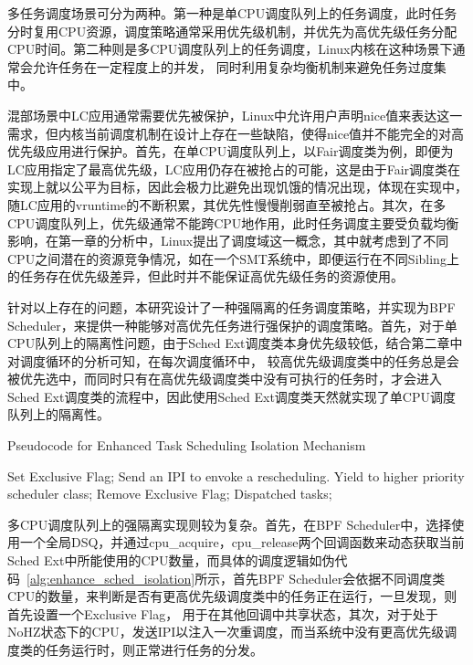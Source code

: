 多任务调度场景可分为两种。第一种是单CPU调度队列上的任务调度，此时任务分时复用CPU资源，调度策略通常采用优先级机制，并优先为高优先级任务分配CPU时间。第二种则是多CPU调度队列上的任务调度，Linux内核在这种场景下通常会允许任务在一定程度上的并发， 同时利用复杂均衡机制来避免任务过度集中。

混部场景中LC应用通常需要优先被保护，Linux中允许用户声明nice值来表达这一需求，但内核当前调度机制在设计上存在一些缺陷，使得nice值并不能完全的对高优先级应用进行保护。首先，在单CPU调度队列上，以Fair调度类为例，即便为LC应用指定了最高优先级，LC应用仍存在被抢占的可能，这是由于Fair调度类在实现上就以公平为目标，因此会极力比避免出现饥饿的情况出现，体现在实现中，随LC应用的vruntime的不断积累，其优先性慢慢削弱直至被抢占。其次，在多CPU调度队列上，优先级通常不能跨CPU地作用，此时任务调度主要受负载均衡影响，在第一章的分析中，Linux提出了调度域这一概念，其中就考虑到了不同CPU之间潜在的资源竞争情况，如在一个SMT系统中，即便运行在不同Sibling上的任务存在优先级差异，但此时并不能保证高优先级任务的资源使用。

针对以上存在的问题，本研究设计了一种强隔离的任务调度策略，并实现为BPF Scheduler，来提供一种能够对高优先任务进行强保护的调度策略。首先，对于单CPU队列上的隔离性问题，由于Sched Ext调度类本身优先级较低，结合第二章中对调度循环的分析可知，在每次调度循环中， 较高优先级调度类中的任务总是会被优先选中，而同时只有在高优先级调度类中没有可执行的任务时，才会进入Sched Ext调度类的流程中，因此使用Sched Ext调度类天然就实现了单CPU调度队列上的隔离性。

\begin{algorithm}
    \caption{Pseudocode for Enhanced Task Scheduling Isolation Mechanism}
    \label{alg:enhance_sched_isolation}
    \begin{algorithmic}[1]
            \State Set Exclusive Flag;
                \State Send an IPI to envoke a rescheduling.
            \EndFor
            \State Yield to higher priority scheduler class;
        \EndIf
        \State Remove Exclusive Flag;
        \State Dispatched tasks;
    \EndWhile
    \end{algorithmic}
\end{algorithm}

多CPU调度队列上的强隔离实现则较为复杂。首先，在BPF Scheduler中，选择使用一个全局DSQ，并通过cpu\_acquire，cpu\_release两个回调函数来动态获取当前Sched Ext中所能使用的CPU数量，而具体的调度逻辑如伪代码~\ref{alg:enhance_sched_isolation}所示，首先BPF Scheduler会依据不同调度类CPU的数量，来判断是否有更高优先级调度类中的任务正在运行，一旦发现，则首先设置一个Exclusive Flag， 用于在其他回调中共享状态，其次，对于处于NoHZ状态下的CPU，发送IPI以注入一次重调度，而当系统中没有更高优先级调度类的任务运行时，则正常进行任务的分发。

